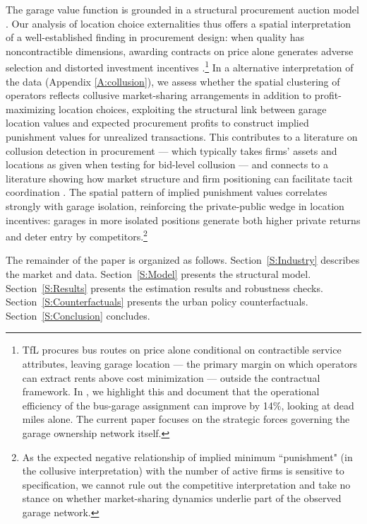 \documentclass[12pt]{article}
\begin{document}
The garage value function is grounded in a structural procurement auction 
model \citep{guerre2000optimal, Cantillon2006, Cantillon2007}. Our analysis of location choice externalities 
thus offers a spatial interpretation of a well-established finding in procurement 
design: when quality has noncontractible dimensions, awarding contracts on 
price alone generates adverse selection and distorted investment incentives 
\citep{laffont1986using, bajari2001incentives, lopomo2023optimal, 
decarolis2014awarding, gagnepain2002incentive}.\footnote{TfL procures bus routes on 
price alone conditional on contractible service attributes, leaving garage 
location --- the primary margin on which operators can extract rents above 
cost minimization --- outside the contractual framework. In \cite{marra-oswald}, we highlight this and document that 
the operational efficiency of the bus-garage assignment can improve by 14\%, looking at dead miles alone. The current paper focuses 
on the strategic forces governing the garage ownership network itself.} In a alternative interpretation of the data (Appendix \ref{A:collusion}), we assess whether the spatial clustering of operators 
reflects collusive market-sharing arrangements in addition to 
profit-maximizing location choices, exploiting the structural link between 
garage location values and expected procurement profits to construct implied 
punishment values for unrealized transactions. This contributes to a 
literature on collusion detection in procurement 
\citep[e.g.,][]{porter1983study, Porter1993, Porter1999, bajari2003deciding, 
kawai2022detecting} --- which typically takes firms' assets and locations 
as given when testing for bid-level collusion --- and connects to a 
literature showing how market structure and firm positioning can facilitate 
tacit coordination \citep[e.g.,][]{miller2017understanding, bourreau2021market, 
berry2001mergers, sullivan2017ice}. The spatial pattern of implied punishment 
values correlates strongly with garage isolation, reinforcing the 
private-public wedge in location incentives: garages in more isolated 
positions generate both higher private returns and deter entry by competitors.\footnote{As the expected negative 
relationship of implied minimum ``punishment" (in the collusive interpretation) with the number of active firms is sensitive to specification, we cannot rule out the competitive interpretation and take no stance on whether market-sharing dynamics underlie part of the observed garage network.}

The remainder of the paper is organized as follows. Section~\ref{S:Industry} 
describes the market and data. Section~\ref{S:Model} presents the structural 
model. Section~\ref{S:Results} presents the estimation results and robustness 
checks. Section~\ref{S:Counterfactuals} presents the urban policy 
counterfactuals. Section~\ref{S:Conclusion} concludes. 
\end{document}
